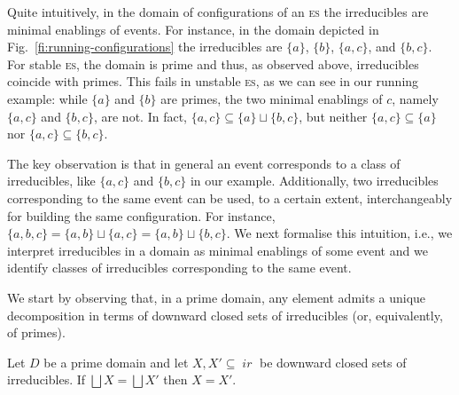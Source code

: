 \documentclass[conference]{IEEEtran}
\newcommand{\ir}[1]{\ensuremath{\mathop{\mathit{ir}({#1})}}}
\newcommand{\esabbr}{\textsc{es}}
\begin{document}
Quite intuitively, in the domain of configurations of an {\esabbr} the
irreducibles are minimal enablings of events. For instance, in the
domain depicted in Fig.~\ref{fi:running-configurations} the
irreducibles are $\{a\}$, $\{b\}$, $\{ a, c \}$, and $\{ b, c \}$.
%
For stable {\esabbr}, the domain is prime and thus, as observed
above, irreducibles coincide with primes. This fails in unstable {\esabbr},
as we can see in our running example: while $\{a\}$ and
$\{b\}$ are primes, the two minimal enablings of $c$, namely
$\{ a, c \}$ and $\{ b, c \}$, are not. In fact,
$\{ a, c \} \subseteq \{ a \} \sqcup \{ b, c\}$, but neither
$\{ a, c \} \subseteq \{ a \}$ nor $\{ a, c\} \subseteq \{ b, c\}$.

%
The key observation is that in general an event corresponds to a class of
irreducibles, like $\{ a,c\}$ and $\{ b, c\}$ in our
example. Additionally, two irreducibles corresponding to the same
event can be used, to a certain extent, interchangeably for building
the same configuration. For instance,
$\{ a, b, c \} = \{a, b \} \sqcup \{ a, c \} = \{a, b \} \sqcup \{ b, c
\}$.
%
We next formalise this intuition, i.e., we interpret
irreducibles in a domain as minimal enablings of some event and we
identify classes of irreducibles corresponding to the same event.


We start by observing that, in a prime domain, any element admits a unique decomposition in terms of downward closed sets of irreducibles (or, equivalently, of primes).

\begin{lemma}
  \label{le:unique-decomposition}
  Let $D$ be a prime domain and let $X, X' \subseteq \ir{D}$ be
  downward closed sets of irreducibles.
  If $\bigsqcup X = \bigsqcup X'$ then $X=X'$.
\end{lemma}
\end{document}
